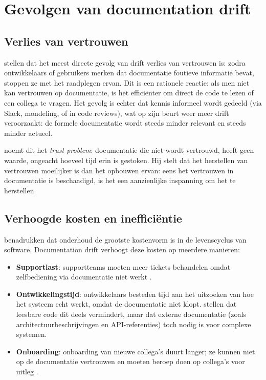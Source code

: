 \section{Gevolgen van documentation drift}
\label{sec:drift-gevolgen}

\subsection{Verlies van vertrouwen}
\textcite{bhatti2021docsdevelopers} stellen dat het meest directe gevolg van drift verlies van vertrouwen is: zodra ontwikkelaars of gebruikers merken dat documentatie foutieve informatie bevat, stoppen ze met het raadplegen ervan. Dit is een rationele reactie: als men niet kan vertrouwen op documentatie, is het efficiënter om direct de code te lezen of een collega te vragen. Het gevolg is echter dat kennis informeel wordt gedeeld (via Slack, mondeling, of in code reviews), wat op zijn beurt weer meer drift veroorzaakt: de formele documentatie wordt steeds minder relevant en steeds minder actueel.

\textcite{martraire2019livingdocumentation} noemt dit het \textit{trust problem}: documentatie die niet wordt vertrouwd, heeft geen waarde, ongeacht hoeveel tijd erin is gestoken. Hij stelt dat het herstellen van vertrouwen moeilijker is dan het opbouwen ervan: eens het vertrouwen in documentatie is beschaadigd, is het een aanzienlijke inspanning om het te herstellen.

\subsection{Verhoogde kosten en inefficiëntie}
\textcite{tripathy2014softwareevolution} benadrukken dat onderhoud de grootste kostenvorm is in de levenscyclus van software. Documentation drift verhoogt deze kosten op meerdere manieren:

\begin{itemize}
    \item \textbf{Supportlast}: supportteams moeten meer tickets behandelen omdat zelfbediening via documentatie niet werkt \autocite{bhatti2021docsdevelopers}.
    \item \textbf{Ontwikkelingstijd}: ontwikkelaars besteden tijd aan het uitzoeken van hoe het systeem echt werkt, omdat de documentatie niet klopt. \textcite{boswell2011readablecode} stellen dat leesbare code dit deels vermindert, maar dat externe documentatie (zoals architectuurbeschrijvingen en API-referenties) toch nodig is voor complexe systemen.
    \item \textbf{Onboarding}: onboarding van nieuwe collega's duurt langer; ze kunnen niet op de documentatie vertrouwen en moeten beroep doen op collega's voor uitleg \autocite{bhatti2021docsdevelopers}.
\end{itemize}

